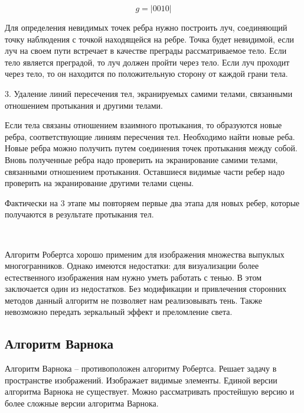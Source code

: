\begin{equation}
g = |0010|
\label{eq:ref3}	
\end{equation} 

Для определения невидимых точек ребра нужно построить луч, соединяющий точку наблюдения с точкой находящейся на ребре.
Точка будет невидимой, если луч на своем пути встречает в качестве преграды рассматриваемое тело.
Если тело является преградой, то луч должен пройти через тело.
Если луч проходит через тело, то он находится по положительную сторону от каждой грани тела.

3. Удаление линий пересечения тел, экранируемых самими телами, связанными отношением протыкания и другими телами.

Если тела связаны отношением взаимного протыкания, то образуются новые ребра, соответствующие линиям пересчения тел. Необходимо найти новые реба. Новые ребра можно получить путем соединения точек протыкания между собой. Вновь полученные ребра надо проверить на экранирование самими телами, связанными отношением протыкания. Оставшиеся видимые части ребер надо проверить на экранирование другими телами сцены.

Фактически на 3 этапе мы повторяем первые два этапа для новых ребер, которые получаются в результате протыкания тел.

~

Алгоритм Робертса хорошо применим для изображения множества выпуклых многогранников. Однако имеются недостатки: для визуализации более естественного изображения нам нужно уметь работать с тенью. В этом заключается один из недостатков. Без модификации и привлечения сторонних методов данный алгоритм не позволяет нам реализовывать тень. Также невозможно передать зеркальный эффект и преломление света.

\subsection{Алгоритм Варнока}

Алгоритм Варнока -- противоположен алгоритму Робертса. Решает задачу в пространстве изображений. Изображает видимые элементы. Единой версии алгоритма Варнока не существует. Можно рассматривать простейшую версию и более сложные версии алгоритма Варнока.

\begin{figure}[ht!]
\end{figure}

